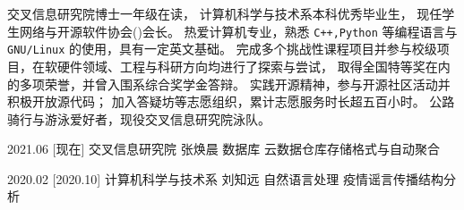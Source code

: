 \documentclass[zh]{resume}
\begin{document}
\makeheader

{\onehalfspacing\vspace{0.5em}\hspace{2em}%
交叉信息研究院博士一年级在读，
计算机科学与技术系本科优秀毕业生，
现任学生网络与开源软件协会()会长。
热爱计算机专业，熟悉 \texttt{C++,Python} 等编程语言与 \texttt{GNU/Linux} 的使用，具有一定英文基础。
完成多个挑战性课程项目并参与校级项目，在软硬件领域、工程与科研方向均进行了探索与尝试，
取得全国特等奖在内的多项荣誉，并曾入围系综合奖学金答辩。
实践开源精神，参与开源社区活动并积极开放源代码；
加入答疑坊等志愿组织，累计志愿服务时长超五百小时。
公路骑行与游泳爱好者，现役交叉信息研究院泳队。
\par}

\begin{competences}
  \separator{0.1em}


\end{competences}

\begin{educations}
  \separator{0.2em}

  \education%
    {2021.06}%
    [现在]%
    {交叉信息研究院}%
    {张焕晨}%
    {数据库}%
    {云数据仓库存储格式与自动聚合}

  \separator{0.5em}
  \education%
    {2020.02}%
    [2020.10]%
    {计算机科学与技术系}%
    {刘知远}%
    {自然语言处理}%
    {疫情谣言传播结构分析}
\end{educations}
\end{document}
